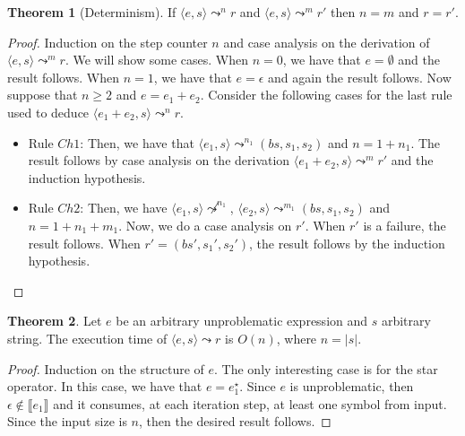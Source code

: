 \documentclass[review]{elsarticle}
\newcommand{\sembrackets}[1]{\ensuremath{\llbracket #1 \rrbracket}}
\theoremstyle{definition}
\newtheorem*{Theorem*}{Theorem}
\begin{document}
\begin{Theorem*}[Determinism]
  If $\langle e, s \rangle \leadsto^n r$ and $\langle e, s \rangle \leadsto^m r'$
  then $n = m$ and $r = r'$.
\end{Theorem*}
\begin{proof}
  Induction on the step counter $n$ and case analysis on the derivation of
  $\langle e, s \rangle \leadsto^m r$. We will show some cases. When $n = 0$,
  we have that $e = \emptyset$ and the result follows. When $n = 1$, we have
  that $e = \epsilon$ and again the result follows. Now suppose that $n \geq 2$
  and $e = e_1 + e_2$. Consider the following cases for the last rule used to
  deduce $\langle e_1 + e_2, s \rangle \leadsto^n r$.
  \begin{itemize}
    \item Rule $Ch1$: Then, we have that $\langle e_1, s \rangle \leadsto^{n_1}
      (bs, s_1, s_2)$ and $n = 1 + n_1$. The result follows by case analysis on the
      derivation $\langle e_1 + e_2, s \rangle \leadsto^{m}
      r'$ and the induction hypothesis.
    \item Rule $Ch2$: Then, we have $\langle e_1, s \rangle \not\leadsto^{n_1}$,
      $\langle e_2, s \rangle \leadsto^{m_1} (bs, s_1, s_2)$ and $n = 1 + n_1 +
      m_1$. Now, we do a case analysis on $r'$. When $r'$ is a failure, the 
      result follows. When $r' = (bs', s_1', s_2')$, the result follows by 
      the induction hypothesis.
  \end{itemize}
\end{proof}


\begin{Theorem*}
  Let $e$ be an arbitrary unproblematic expression and $s$ arbitrary string.
  The execution time of $\langle e, s \rangle\leadsto r$ is $O(n)$, where $n = |s|$.
\end{Theorem*}
\begin{proof}
  Induction on the structure of $e$. The only interesting case is for the
  star operator. In this case, we have that $e = e_1^\star$.
  Since $e$ is unproblematic, then
  $\epsilon \not\in\sembrackets{e_1}$ and it consumes, at each iteration step,
  at least one symbol from input. Since the input size is $n$, then the
  desired result follows.
\end{proof}
\end{document}
